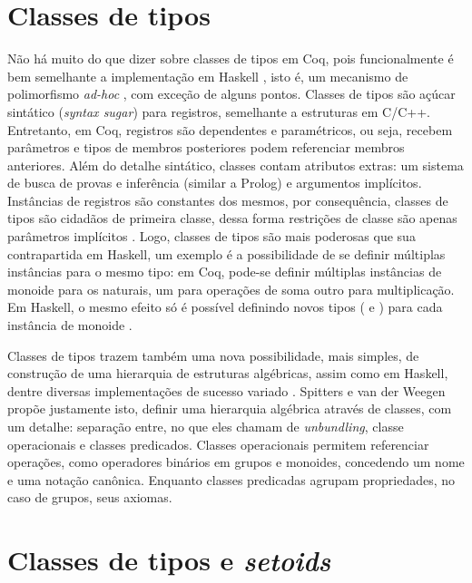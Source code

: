\section{Classes de tipos}\label{sec:classes}
Não há muito do que dizer sobre classes de tipos em Coq, pois funcionalmente é bem semelhante a implementação em Haskell \cite{Hall1996}, isto é, um mecanismo de polimorfismo \textit{ad-hoc} \cite{Wadler1989}, com exceção de alguns pontos. Classes de tipos são açúcar sintático (\textit{syntax sugar}) para registros, semelhante a estruturas em C/C++. Entretanto, em Coq, registros são dependentes e paramétricos, ou seja, recebem parâmetros e tipos de membros posteriores podem referenciar membros anteriores. Além do detalhe sintático, classes contam atributos extras: um sistema de busca de provas e inferência (similar a Prolog) e argumentos implícitos. Instâncias de registros são constantes dos mesmos, por consequência, classes de tipos são cidadãos de primeira classe, dessa forma restrições de classe são apenas parâmetros implícitos \cite{Sozeau2008}. Logo, classes de tipos são mais poderosas que sua contrapartida em Haskell, um exemplo é a possibilidade de se definir múltiplas instâncias para o mesmo tipo: em Coq, pode-se definir múltiplas instâncias de monoide para os naturais, um para operações de soma outro para multiplicação. Em Haskell, o mesmo efeito só é possível definindo novos tipos ( e ) para cada instância de monoide \cite{HaskellMonoid}.

Classes de tipos trazem também uma nova possibilidade, mais simples, de construção de uma hierarquia de estruturas algébricas, assim como em Haskell, dentre diversas implementações de sucesso variado \cite{Geuvers2002,CruzFilipe2004,Garillot2009,Cohen2020}. Spitters e van der Weegen \cite{Spitters2011} propõe justamente isto, definir uma hierarquia algébrica através de classes, com um detalhe: separação entre, no que eles chamam de \textit{unbundling}, classe operacionais e classes predicados. Classes operacionais permitem referenciar operações, como operadores binários em grupos e monoides, concedendo um nome e uma notação canônica. Enquanto classes predicadas agrupam propriedades, no caso de grupos, seus axiomas. 

\section{Classes de tipos e \textit{setoids}}\label{sec:classes-setoids}

